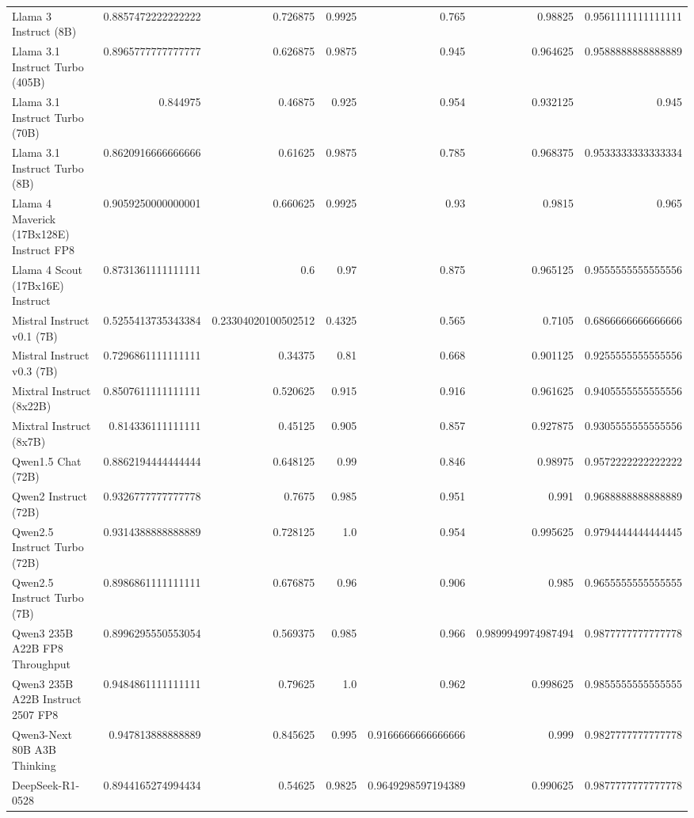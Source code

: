 \begin{table}[htp]
{\begin{tabular}{lrrrrrr}
Llama 3 Instruct (8B) & 0.8857472222222222 & 0.726875 & 0.9925 & 0.765 & 0.98825 & 0.9561111111111111 \\
Llama 3.1 Instruct Turbo (405B) & 0.8965777777777777 & 0.626875 & 0.9875 & 0.945 & 0.964625 & 0.9588888888888889 \\
Llama 3.1 Instruct Turbo (70B) & 0.844975 & 0.46875 & 0.925 & 0.954 & 0.932125 & 0.945 \\
Llama 3.1 Instruct Turbo (8B) & 0.8620916666666666 & 0.61625 & 0.9875 & 0.785 & 0.968375 & 0.9533333333333334 \\
Llama 4 Maverick (17Bx128E) Instruct FP8 & 0.9059250000000001 & 0.660625 & 0.9925 & 0.93 & 0.9815 & 0.965 \\
Llama 4 Scout (17Bx16E) Instruct & 0.8731361111111111 & 0.6 & 0.97 & 0.875 & 0.965125 & 0.9555555555555556 \\
Mistral Instruct v0.1 (7B) & 0.5255413735343384 & 0.23304020100502512 & 0.4325 & 0.565 & 0.7105 & 0.6866666666666666 \\
Mistral Instruct v0.3 (7B) & 0.7296861111111111 & 0.34375 & 0.81 & 0.668 & 0.901125 & 0.9255555555555556 \\
Mixtral Instruct (8x22B) & 0.8507611111111111 & 0.520625 & 0.915 & 0.916 & 0.961625 & 0.9405555555555556 \\
Mixtral Instruct (8x7B) & 0.814336111111111 & 0.45125 & 0.905 & 0.857 & 0.927875 & 0.9305555555555556 \\
Qwen1.5 Chat (72B) & 0.8862194444444444 & 0.648125 & 0.99 & 0.846 & 0.98975 & 0.9572222222222222 \\
Qwen2 Instruct (72B) & 0.9326777777777778 & 0.7675 & 0.985 & 0.951 & 0.991 & 0.9688888888888889 \\
Qwen2.5 Instruct Turbo (72B) & 0.9314388888888889 & 0.728125 & 1.0 & 0.954 & 0.995625 & 0.9794444444444445 \\
Qwen2.5 Instruct Turbo (7B) & 0.8986861111111111 & 0.676875 & 0.96 & 0.906 & 0.985 & 0.9655555555555555 \\
Qwen3 235B A22B FP8 Throughput & 0.8996295550553054 & 0.569375 & 0.985 & 0.966 & 0.9899949974987494 & 0.9877777777777778 \\
Qwen3 235B A22B Instruct 2507 FP8 & 0.9484861111111111 & 0.79625 & 1.0 & 0.962 & 0.998625 & 0.9855555555555555 \\
Qwen3-Next 80B A3B Thinking & 0.947813888888889 & 0.845625 & 0.995 & 0.9166666666666666 & 0.999 & 0.9827777777777778 \\
DeepSeek-R1-0528 & 0.8944165274994434 & 0.54625 & 0.9825 & 0.9649298597194389 & 0.990625 & 0.9877777777777778 \\

\end{tabular}}
\end{table}
